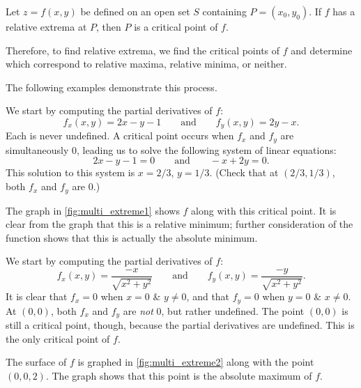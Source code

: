 {Let $z=f(x,y)$ be defined on an open set $S$ containing $P=(x_0,y_0)$. If $f$ has a relative extrema at $P$, then $P$ is a critical point of $f$.}

Therefore, to find relative extrema, we find the critical points of $f$ and determine which correspond to relative maxima, relative minima, or neither.


The following examples demonstrate this process.

{We start by computing the partial derivatives of $f$:
\[f_x(x,y) = 2x-y-1 \qquad \text{and}\qquad f_y(x,y) = 2y-x.\]
Each is never undefined. A critical point occurs when $f_x$ and $f_y$ are simultaneously 0, leading us to solve the following system of linear equations:
\[2x-y-1 = 0\qquad \text{and}\qquad -x+2y = 0.\]
This solution to this system is $x=2/3$, $y=1/3$. (Check that at $(2/3,1/3)$, both $f_x$ and $f_y$ are 0.)

The graph in \autoref{fig:multi_extreme1} shows $f$ along with this critical point. It is clear from the graph that this is a relative minimum; further consideration of the function shows that this is actually the absolute minimum.}

{We start by computing the partial derivatives of $f$:
\[f_x(x,y) = \frac{-x}{\sqrt{x^2+y^2}}\qquad \text{and}\qquad f_y(x,y) = \frac{-y}{\sqrt{x^2+y^2}}.\]
It is clear that $f_x=0$ when $x=0$ \& $y\neq0$, and that $f_y=0$ when $y=0$ \& $x\neq0$. At $(0,0)$, both $f_x$ and $f_y$ are \textit{not} $0$, but rather undefined. The point $(0,0)$ is still a critical point, though, because the partial derivatives are undefined. This is the only critical point of $f$.

The surface of $f$ is graphed in \autoref{fig:multi_extreme2} along with the point $(0,0,2)$. The graph shows that this point is the absolute maximum of $f$.}

